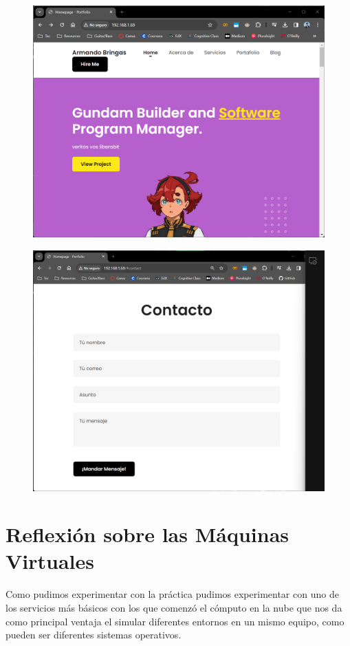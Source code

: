 \documentclass[12pt,a4paper]{article}
\begin{document}
\begin{figure}[H]
    \centering
    \includegraphics[width=.75\linewidth]{M3_Virtualización_y_Contenedores/Tarea_2_Máquina_Virtual_Local/reporte/figuras/7-1_Resultados.png}
    \label{fig:Resultados_1}
\end{figure}


\begin{figure}[H]
    \centering
    \includegraphics[width=.75\linewidth]{M3_Virtualización_y_Contenedores/Tarea_2_Máquina_Virtual_Local/reporte/figuras/7-2_Resultados.png}
    \label{fig:Resultados_2}
\end{figure}


\section{Reflexión sobre las Máquinas Virtuales}

Como pudimos experimentar con la práctica pudimos experimentar con uno de los servicios más básicos con los que comenzó el cómputo en la nube que nos da como principal ventaja el simular diferentes entornos en un mismo equipo, como pueden ser diferentes sistemas operativos. 
\end{document}
